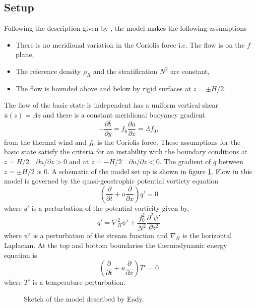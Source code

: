 \documentclass[a4paper,12pt]{article}
\begin{document}
\subsection{Setup}
Following the description given by \cite{Hoskins2013}, the model makes the following assumptions
\begin{itemize}
  \item There is no meridional variation in the Coriolis force i.e. The flow is on the $f$ plane,
  \item The reference density $\rho_R$ and the stratification $N^2$ are constant,
  \item The flow is bounded above and below by rigid surfaces at $z=\pm H/2$. 
\end{itemize}
The flow of the basic state is independent has a uniform vertical shear $\overline{u}(z) = \Lambda z$ and there is a constant meridional buoyancy gradient 
\begin{equation}
  -\frac{\partial\overline{b}}{\partial y} = f_0\frac{\partial\overline{u}}{\partial z}= \Lambda f_0,
\end{equation}
from the thermal wind and $f_0$ is the Coriolis force. These assumptions for the basic state satisfy the criteria for an instability with the boundary conditions at $ z= H/2 \quad \partial\overline u/\partial z > 0$ and at $ z= -H/2 \quad \partial\overline{u}/\partial z < 0$. The gradient of $\overline{q}$ between $z=\pm H/2$ is 0. A schematic of the model set up is shown in figure \ref{eadyexample}. Flow in this model is governed by the quasi-geostrophic potential vorticty equation
\begin{equation}
  \left(\frac{\partial}{\partial t} +\overline{u}\frac{\partial}{\partial x}\right)q' = 0 
\end{equation}
where $q'$ is a perturbation of the potential vorticity given by,
\begin{equation}
  q' = \nabla^2_{H} \psi' +\frac{f_0^2}{N^2}\frac{\partial^2\psi'}{\partial z^2}
\end{equation}
where $\psi'$ is a perturbation of the stream function and $\nabla_H$ is the horizontal Laplacian. At the top and bottom boundaries the thermodynamic energy equation is 
\begin{equation}
  \left(\frac{\partial}{\partial t}+\overline{u}\frac{\partial}{\partial x}\right)T' = 0
\end{equation}
where $T'$ is a temperature perturbation. 
\begin{figure}[ht]
  \centering
  
  \caption{Sketch of the model described by Eady.}
  \label{eadyexample}
\end{figure}
\end{document}
